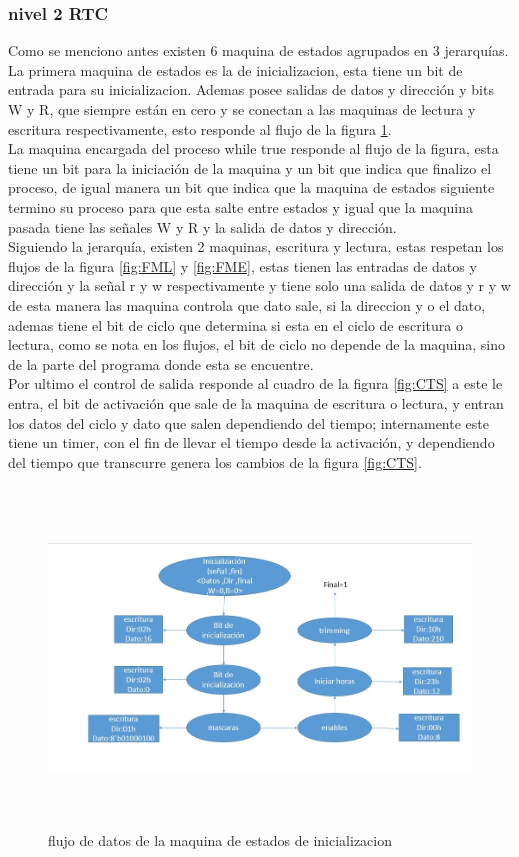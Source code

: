 \documentclass[12pt,a4paper]{article}
\begin{document}
\subsubsection{nivel 2 RTC}
Como se menciono antes existen 6 maquina de estados agrupados en 3 jerarquías.\\[2ex]
La primera maquina de estados es la de inicializacion, esta tiene un bit de entrada para su inicializacion. Ademas posee salidas de datos y dirección  y bits W y R, que siempre están en cero y se conectan a las maquinas de lectura y escritura respectivamente, esto responde al flujo de la figura \ref{fig:FMEI}.\\[ex]
La maquina encargada del proceso while true responde al flujo de la figura, esta tiene un bit para la iniciación de la maquina y un bit que indica que finalizo el proceso, de igual manera un bit que indica que la maquina de estados siguiente termino su proceso para que esta salte entre estados y igual que la maquina pasada tiene las señales W y R y la salida de datos y dirección.\\[2ex]
Siguiendo la jerarquía, existen 2 maquinas, escritura y lectura, estas respetan los flujos de la figura \ref{fig:FML} y \ref{fig:FME}, estas tienen las entradas de datos y dirección y la señal r y w respectivamente y tiene solo una salida de datos y r y w de esta manera las maquina controla que dato sale, si la direccion y o el dato, ademas tiene el bit de ciclo que determina si esta en el ciclo de escritura o lectura, como se nota en los flujos, el bit de ciclo no depende de la maquina, sino de la parte del programa donde esta se encuentre.\\[2ex]
Por ultimo el control de salida responde al cuadro de la figura \ref{fig:CTS} a este le entra, el bit de activación que sale de la maquina de escritura o lectura, y entran los datos del ciclo y dato que salen dependiendo del tiempo; internamente este tiene un timer, con el fin de llevar el tiempo desde la activación, y dependiendo del tiempo que transcurre genera los cambios de la figura \ref{fig:CTS}. \\[2ex]
\begin{figure}[htbp]
	\centering
	\includegraphics[height=9cm, width=16cm]{img/FlujoInit.jpg}
	\caption[3erNivel]{flujo de datos de la maquina de estados de inicializacion}
	\label{fig:FMEI}
\end{figure}
\end{document}
